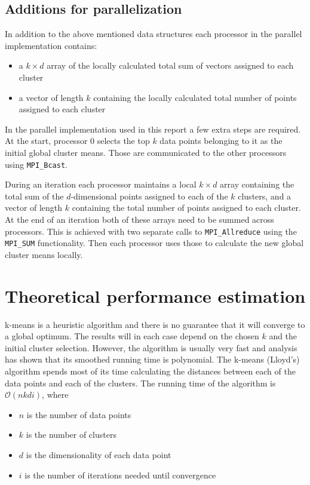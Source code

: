 \documentclass[parskip=true]{scrartcl}
\begin{document}
\subsection{Additions for parallelization}
In addition to the above mentioned data structures each processor in the parallel implementation contains:
\begin{itemize}
    \item a $k \times d$ array of the locally calculated total sum of vectors assigned to each cluster
    \item a vector of length $k$ containing the locally calculated total number of points assigned to each cluster
\end{itemize}

In the parallel implementation used in this report a few extra steps are required. At the start, processor 0 selects the top $k$ data points belonging to it as the initial global cluster means. Those are communicated to the other processors using \texttt{MPI\_Bcast}. 

During an iteration each processor maintains a local $k \times d$ array containing the total sum of the $d$-dimensional points assigned to each of the $k$ clusters, and a vector of length $k$ containing the total number of points assigned to each cluster. At the end of an iteration both of these arrays need to be summed across processors. This is achieved with two separate calls to \texttt{MPI\_Allreduce} using the \texttt{MPI\_SUM} functionality. Then each processor uses those to calculate the new global cluster means locally.

\section{Theoretical performance estimation}
k-means is a heuristic algorithm and there is no guarantee that it will converge to a global optimum. The results will in each case depend on the chosen $k$ and the initial cluster selection. However, the algorithm is usually very fast and analysis has shown that its smoothed running time is polynomial\cite{arthur2009k}.
The k-means (Lloyd's) algorithm spends most of its time calculating the distances between each of the data points and each of the clusters. The running time of the algorithm is $\mathcal{O}(nkdi)$, where
\begin{itemize}
    \item $n$ is the number of data points
    \item $k$ is the number of clusters
    \item $d$ is the dimensionality of each data point
    \item $i$ is the number of iterations needed until convergence
\end{itemize}
 
\end{document}

